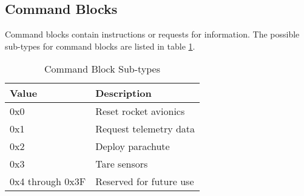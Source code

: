 \subsection{Command Blocks}

Command blocks contain instructions or requests for information. The possible sub-types for command blocks are listed
in table \ref{table:command-subtypes}.

\begin{table}[H]
    \centering
    \begin{tabular}{@{}ll@{}}
        \toprule
        Value            & Description             \\
        \midrule
        0x0              & Reset rocket avionics   \\
        0x1              & Request telemetry data  \\
        0x2              & Deploy parachute        \\
        0x3              & Tare sensors            \\
        0x4 through 0x3F & Reserved for future use \\
        \bottomrule
    \end{tabular}
    \caption{Command Block Sub-types}
    \label{table:command-subtypes}
\end{table}





